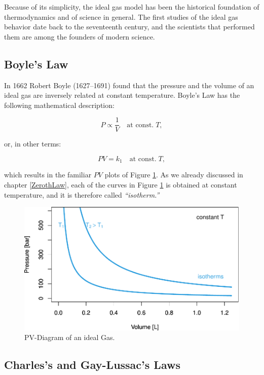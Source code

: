 \documentclass[
  9pt,
]{extbook}
\theoremstyle{definition}
\theoremstyle{definition}
\theoremstyle{definition}
\theoremstyle{remark}
\begin{document}
Because of its simplicity, the ideal gas model has been the historical foundation of thermodynamics and of science in general. The first studies of the ideal gas behavior date back to the seventeenth century, and the scientists that performed them are among the founders of modern science.

\hypertarget{boyles-law}{%
\subsection{Boyle's Law}\label{boyles-law}}

In 1662 Robert Boyle (1627--1691) found that the pressure and the volume of an ideal gas are inversely related at constant temperature. Boyle's Law has the following mathematical description:

\begin{equation}
P\propto\frac{1}{V}\quad\text{at const.}\;T,
\label{eq:boylelaw1}
\end{equation}

or, in other terms:

\begin{equation}
PV=k_1\quad\text{at const.}\;T,
\label{eq:boylelaw2}
\end{equation}

which results in the familiar \(PV\) plots of Figure \ref{fig:FigPVideal}. As we already discussed in chapter \ref{ZerothLaw}, each of the curves in Figure \ref{fig:FigPVideal} is obtained at constant temperature, and it is therefore called \emph{``isotherm.''}

\begin{figure}

{\centering \includegraphics[width=0.7\linewidth]{pchem1_files/figure-latex/FigPVideal-1} 

}

\caption{PV-Diagram of an ideal Gas.}\label{fig:FigPVideal}
\end{figure}

\hypertarget{charless-and-gay-lussacs-laws}{%
\subsection{Charles's and Gay-Lussac's Laws}\label{charless-and-gay-lussacs-laws}}
\end{document}
